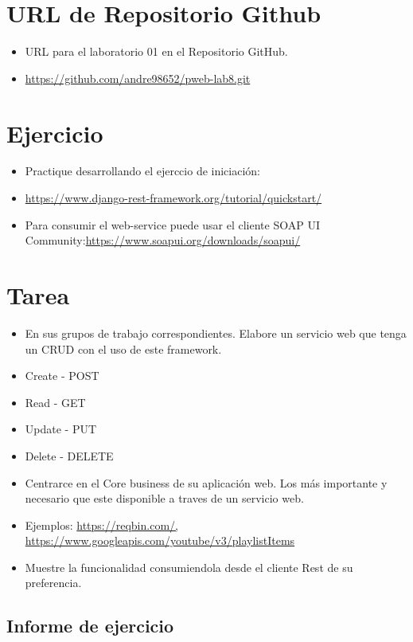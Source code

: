 \documentclass{article}
\begin{document}
	\section{URL de Repositorio Github}
	\begin{itemize}
		
		\item URL para el laboratorio 01 en el Repositorio GitHub.
		\item \url{https://github.com/andre98652/pweb-lab8.git}
	\end{itemize}
	\section{Ejercicio}
	\begin{itemize}
		\item Practique desarrollando el ejerccio de iniciación:
		\item \url{https://www.django-rest-framework.org/tutorial/quickstart/}
		\item Para consumir el web-service puede usar el cliente SOAP UI Community:\url{https://www.soapui.org/downloads/soapui/}
	\end{itemize}
	\section{Tarea}
	\begin{itemize}		
		\item En sus grupos de trabajo correspondientes. Elabore un servicio web que tenga un CRUD con el
uso de este framework.
		\item Create - POST	
		\item Read - GET
		\item Update - PUT
		\item Delete - DELETE
		\item Centrarce en el Core business de su aplicación web. Los más importante y necesario que este disponible a traves de un servicio web.
		\item Ejemplos: \url{https://reqbin.com/, https://www.googleapis.com/youtube/v3/playlistItems}
		\item Muestre la funcionalidad consumiendola desde el cliente Rest de su preferencia.
		
	\end{itemize}
	\subsection{Informe de ejercicio}
	
\end{document}
